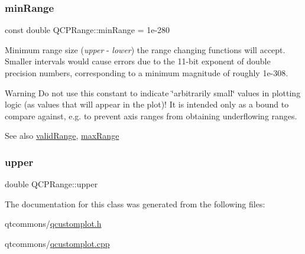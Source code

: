 \subsubsection{\texorpdfstring{minRange}{minRange}}
{\footnotesize\ttfamily const double Q\+C\+P\+Range\+::min\+Range = 1e-\/280\hspace{0.3cm}{\ttfamily [static]}}

Minimum range size ({\itshape upper} -\/ {\itshape lower}) the range changing functions will accept. Smaller intervals would cause errors due to the 11-\/bit exponent of double precision numbers, corresponding to a minimum magnitude of roughly 1e-\/308.

\begin{DoxyWarning}{Warning}
Do not use this constant to indicate \char`\"{}arbitrarily small\char`\"{} values in plotting logic (as values that will appear in the plot)! It is intended only as a bound to compare against, e.\+g. to prevent axis ranges from obtaining underflowing ranges.
\end{DoxyWarning}
\begin{DoxySeeAlso}{See also}
\mbox{\hyperlink{class_q_c_p_range_ab38bd4841c77c7bb86c9eea0f142dcc0}{valid\+Range}}, \mbox{\hyperlink{class_q_c_p_range_a5ca51e7a2dc5dc0d49527ab171fe1f4f}{max\+Range}} 
\end{DoxySeeAlso}
\mbox{\label{class_q_c_p_range_ae44eb3aafe1d0e2ed34b499b6d2e074f}} 
\subsubsection{\texorpdfstring{upper}{upper}}
{\footnotesize\ttfamily double Q\+C\+P\+Range\+::upper}



The documentation for this class was generated from the following files\+:\begin{DoxyCompactItemize}
\item 
qtcommons/\mbox{\hyperlink{qcustomplot_8h}{qcustomplot.\+h}}\item 
qtcommons/\mbox{\hyperlink{qcustomplot_8cpp}{qcustomplot.\+cpp}}\end{DoxyCompactItemize}

